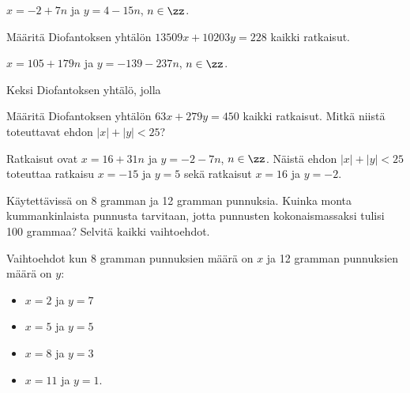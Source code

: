 \begin{tehtavasivu}
\begin{tehtava}
    \begin{vastaus}
        $x = -2 + 7n$ ja $y = 4 - 15n$, $n\in\zz$.
    \end{vastaus}
    
\end{tehtava}

\begin{tehtava}
    Määritä Diofantoksen yhtälön $13509x + 10203y = 228$ kaikki ratkaisut.
    
    \begin{vastaus}
        $x = 105 + 179n$ ja $y = -139 - 237n$, $n\in\zz$.
    \end{vastaus}
    
\end{tehtava}

\begin{tehtava}
    Keksi Diofantoksen yhtälö, jolla
    \begin{alakohdat}
    \end{alakohdat}

    \begin{vastaus}
        \begin{alakohdat}
        \end{alakohdat}
    \end{vastaus}
    
\end{tehtava}

\begin{tehtava}
    Määritä Diofantoksen yhtälön $63x + 279y = 450$ kaikki ratkaisut. Mitkä niistä toteuttavat ehdon $|x| + |y| < 25$?
    
    \begin{vastaus}
        Ratkaisut ovat $x = 16 + 31n$ ja $y = -2 - 7n$, $n\in\zz$. Näistä ehdon $|x| + |y| < 25$ toteuttaa ratkaisu $x = -15$ ja $y = 5$ sekä ratkaisut $x = 16$ ja $y = -2$.
    \end{vastaus}
    
\end{tehtava}

\begin{tehtava}
    Käytettävissä on 8 gramman ja 12 gramman punnuksia. Kuinka monta kummankinlaista punnusta tarvitaan, jotta punnusten kokonaismassaksi tulisi 100 grammaa? Selvitä kaikki vaihtoehdot.
    
    \begin{vastaus}
        Vaihtoehdot kun 8 gramman punnuksien määrä on $x$ ja 12 gramman punnuksien määrä on $y$:
        \begin{itemize}
            \item $x = 2$ ja $y = 7$
            \item $x = 5$ ja $y = 5$
            \item $x = 8$ ja $y = 3$
            \item $x = 11$ ja $y = 1$.
        \end{itemize}
    \end{vastaus}
    

\end{tehtava}
\end{tehtavasivu}
